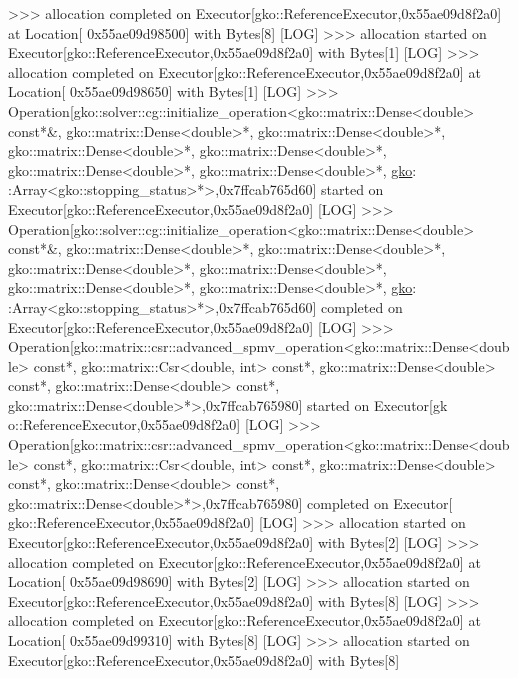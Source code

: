 \begin{DoxyCode}
[LOG] >>> allocation completed on Executor[gko::ReferenceExecutor,0x55ae09d8f2a0] at Location[
      0x55ae09d98500] with Bytes[8]
[LOG] >>> allocation started on Executor[gko::ReferenceExecutor,0x55ae09d8f2a0] with Bytes[1]
[LOG] >>> allocation completed on Executor[gko::ReferenceExecutor,0x55ae09d8f2a0] at Location[
      0x55ae09d98650] with Bytes[1]
[LOG] >>> Operation[gko::solver::cg::initialize\_operation<gko::matrix::Dense<double> \textcolor{keyword}{const}*&, 
      gko::matrix::Dense<double>*, gko::matrix::Dense<double>*, gko::matrix::Dense<double>*, gko::matrix::Dense<double>*, 
      gko::matrix::Dense<double>*, gko::matrix::Dense<double>*, \hyperlink{namespacegko}{gko}:
:Array<gko::stopping\_status>*>,0x7ffcab765d60] started on Executor[gko::ReferenceExecutor,0x55ae09d8f2a0]
[LOG] >>> Operation[gko::solver::cg::initialize\_operation<gko::matrix::Dense<double> \textcolor{keyword}{const}*&, 
      gko::matrix::Dense<double>*, gko::matrix::Dense<double>*, gko::matrix::Dense<double>*, gko::matrix::Dense<double>*, 
      gko::matrix::Dense<double>*, gko::matrix::Dense<double>*, \hyperlink{namespacegko}{gko}:
:Array<gko::stopping\_status>*>,0x7ffcab765d60] completed on Executor[gko::ReferenceExecutor,0x55ae09d8f2a0]
[LOG] >>> Operation[gko::matrix::csr::advanced\_spmv\_operation<gko::matrix::Dense<double> \textcolor{keyword}{const}*, 
      gko::matrix::Csr<double, int> \textcolor{keyword}{const}*, gko::matrix::Dense<double> \textcolor{keyword}{const}*, gko::matrix::Dense<double> \textcolor{keyword}{const}*, 
      gko::matrix::Dense<double>*>,0x7ffcab765980] started on Executor[gk
o::ReferenceExecutor,0x55ae09d8f2a0]
[LOG] >>> Operation[gko::matrix::csr::advanced\_spmv\_operation<gko::matrix::Dense<double> \textcolor{keyword}{const}*, 
      gko::matrix::Csr<double, int> \textcolor{keyword}{const}*, gko::matrix::Dense<double> \textcolor{keyword}{const}*, gko::matrix::Dense<double> \textcolor{keyword}{const}*, 
      gko::matrix::Dense<double>*>,0x7ffcab765980] completed on Executor[
gko::ReferenceExecutor,0x55ae09d8f2a0]
[LOG] >>> allocation started on Executor[gko::ReferenceExecutor,0x55ae09d8f2a0] with Bytes[2]
[LOG] >>> allocation completed on Executor[gko::ReferenceExecutor,0x55ae09d8f2a0] at Location[
      0x55ae09d98690] with Bytes[2]
[LOG] >>> allocation started on Executor[gko::ReferenceExecutor,0x55ae09d8f2a0] with Bytes[8]
[LOG] >>> allocation completed on Executor[gko::ReferenceExecutor,0x55ae09d8f2a0] at Location[
      0x55ae09d99310] with Bytes[8]
[LOG] >>> allocation started on Executor[gko::ReferenceExecutor,0x55ae09d8f2a0] with Bytes[8]

\end{DoxyCode}
